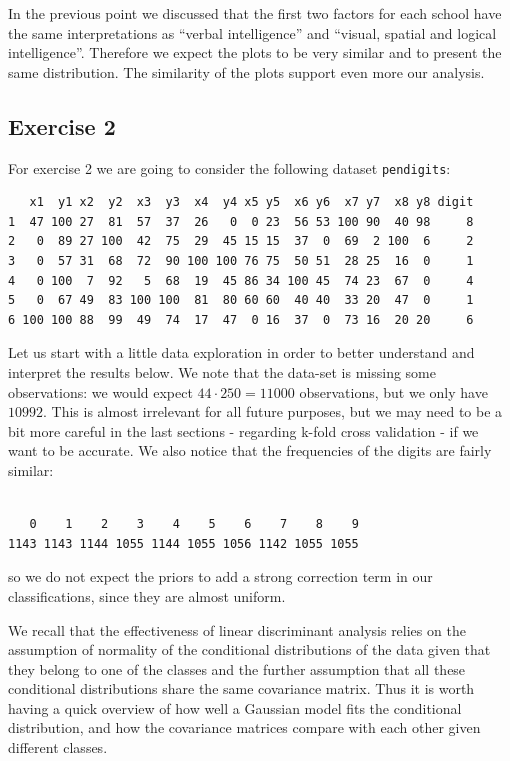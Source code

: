 \documentclass[
  letterpaper,
  DIV=11,
  numbers=noendperiod]{scrartcl}
\begin{document}
In the previous point we discussed that the first two factors for each
school have the same interpretations as ``verbal intelligence'' and
``visual, spatial and logical intelligence''. Therefore we expect the
plots to be very similar and to present the same distribution. The
similarity of the plots support even more our analysis.

\hypertarget{exercise-2}{%
\subsection{Exercise 2}\label{exercise-2}}

For exercise 2 we are going to consider the following dataset
\texttt{pendigits}:

\begin{verbatim}
   x1  y1 x2  y2  x3  y3  x4  y4 x5 y5  x6 y6  x7 y7  x8 y8 digit
1  47 100 27  81  57  37  26   0  0 23  56 53 100 90  40 98     8
2   0  89 27 100  42  75  29  45 15 15  37  0  69  2 100  6     2
3   0  57 31  68  72  90 100 100 76 75  50 51  28 25  16  0     1
4   0 100  7  92   5  68  19  45 86 34 100 45  74 23  67  0     4
5   0  67 49  83 100 100  81  80 60 60  40 40  33 20  47  0     1
6 100 100 88  99  49  74  17  47  0 16  37  0  73 16  20 20     6
\end{verbatim}

Let us start with a little data exploration in order to better
understand and interpret the results below. We note that the data-set is
missing some observations: we would expect \(44\cdot 250=11000\)
observations, but we only have \(10992\). This is almost irrelevant for
all future purposes, but we may need to be a bit more careful in the
last sections - regarding k-fold cross validation - if we want to be
accurate. We also notice that the frequencies of the digits are fairly
similar:

\begin{verbatim}

   0    1    2    3    4    5    6    7    8    9 
1143 1143 1144 1055 1144 1055 1056 1142 1055 1055 
\end{verbatim}

so we do not expect the priors to add a strong correction term in our
classifications, since they are almost uniform.

We recall that the effectiveness of linear discriminant analysis relies
on the assumption of normality of the conditional distributions of the
data given that they belong to one of the classes and the further
assumption that all these conditional distributions share the same
covariance matrix. Thus it is worth having a quick overview of how well
a Gaussian model fits the conditional distribution, and how the
covariance matrices compare with each other given different classes.
\end{document}
